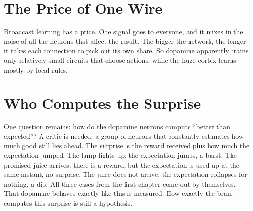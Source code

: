 \section*{The Price of One Wire}

Broadcast learning has a price. One signal goes to everyone, and it mixes in the noise of all the neurons that affect the result. The bigger the network, the longer it takes each connection to pick out its own share. So dopamine apparently trains only relatively small circuits that choose actions, while the huge cortex learns mostly by local rules.

\section*{Who Computes the Surprise}

One question remains: how do the dopamine neurons compute ``better than expected''? A critic is needed: a group of neurons that constantly estimates how much good still lies ahead. The surprise is the reward received plus how much the expectation jumped. The lamp lights up: the expectation jumps, a burst. The promised juice arrives: there is a reward, but the expectation is used up at the same instant, no surprise. The juice does not arrive: the expectation collapses for nothing, a dip. All three cases from the first chapter come out by themselves. That dopamine behaves exactly like this is measured. How exactly the brain computes this surprise is still a hypothesis.

